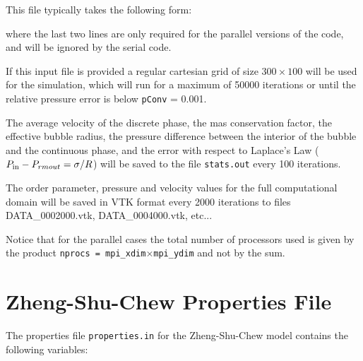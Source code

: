 \documentclass[12pt]{report}
\begin{document}
This file typically takes the following form:


where the last two lines are only required for the parallel versions of the code, and will be ignored by the serial code.

If this input file is provided a regular cartesian grid of size $300\times100$ will be used for the simulation, which will run for a maximum of 50000 iterations or until the relative pressure error is below \verb+pConv+ = 0.001.

The average velocity of the discrete phase, the mas conservation factor, the effective bubble radius, the pressure difference between the interior of the bubble and the continuous phase, and the error with respect to Laplace's Law ($P_{\rm in} - P_{rm out} = \sigma/R$) will be saved to the file \verb+stats.out+ every 100 iterations.

The order parameter, pressure and velocity values for the full computational domain will be saved in VTK format every 2000 iterations to files DATA\_0002000.vtk, DATA\_0004000.vtk, etc...

Notice that for the parallel cases the total number of processors used is given by the product \texttt{nprocs = mpi\_xdim$\times$mpi\_ydim} and not by the sum.


\section{Zheng-Shu-Chew Properties File}
The properties file \verb+properties.in+ for the Zheng-Shu-Chew model contains the following variables:
\end{document}
